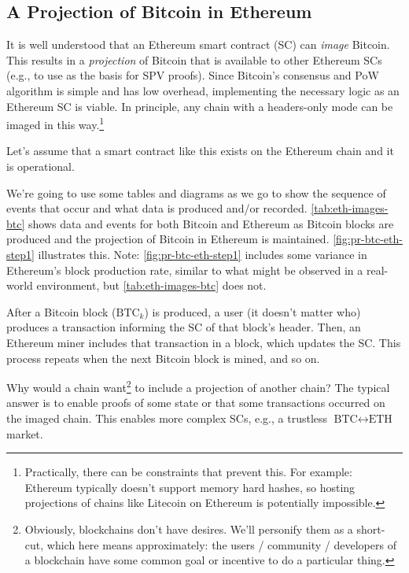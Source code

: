 
\subsection{A Projection of Bitcoin in Ethereum}

It is well understood that an Ethereum smart contract (SC) can \emph{image} Bitcoin.
This results in a \emph{projection} of Bitcoin that is available to other Ethereum SCs (e.g., to use as the basis for SPV proofs).
Since Bitcoin's consensus and PoW algorithm is simple and has low overhead, implementing the necessary logic as an Ethereum SC is viable.
In principle, any chain with a headers-only mode can be imaged in this way.\footnote{
    Practically, there can be constraints that prevent this.
    For example: Ethereum typically doesn't support memory hard hashes, so hosting projections of chains like Litecoin on Ethereum is potentially impossible.
}

Let's assume that a smart contract like this exists on the Ethereum chain and it is operational.

We're going to use some tables and diagrams as we go to show the sequence of events that occur and what data is produced and/or recorded.
\autoref{tab:eth-images-btc} shows data and events for both Bitcoin and Ethereum as Bitcoin blocks are produced and the projection of Bitcoin in Ethereum is maintained.
\autoref{fig:pr-btc-eth-step1} illustrates this.
Note: \autoref{fig:pr-btc-eth-step1} includes some variance in Ethereum's block production rate, similar to what might be observed in a real-world environment, but \autoref{tab:eth-images-btc} does not.

After a Bitcoin block ($\text{BTC}_k$) is produced, a user (it doesn't matter who) produces a transaction informing the SC of that block's header.
Then, an Ethereum miner includes that transaction in a block, which updates the SC.
This process repeats when the next Bitcoin block is mined, and so on.

Why would a chain want\footnote{
    Obviously, blockchains don't have desires.
    We'll personify them as a short-cut, which here means approximately: the users / community / developers of a blockchain have some common goal or incentive to do a particular thing.
} to include a projection of another chain?
The typical answer is to enable proofs of some state or that some transactions occurred on the imaged chain.
This enables more complex SCs, e.g., a trustless $\text{BTC}\leftrightarrow\text{ETH}$ market.


